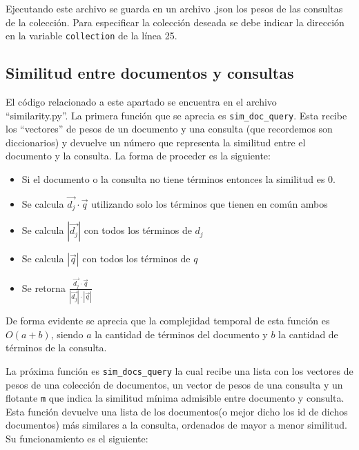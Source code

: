 \documentclass[runningheads]{llncs}
\begin{document}
	Ejecutando este archivo se guarda en un archivo .json los pesos de las consultas de la colecci\'on. Para especificar la colecci\'on deseada se debe indicar la direcci\'on en la variable \verb|collection| de la l\'inea 25.
	
	\subsection{Similitud entre documentos y consultas}
	
	El c\'odigo relacionado  a este apartado se encuentra en el archivo\\ ``similarity.py''. La primera funci\'on que se aprecia es \verb|sim_doc_query|. Esta recibe los ``vectores'' de pesos de un documento y una consulta (que recordemos son diccionarios) y devuelve un n\'umero que representa la similitud entre el documento y la consulta. La forma de proceder es la siguiente:
	
	\begin{itemize}
		\item Si el documento o la consulta no tiene t\'erminos entonces la similitud es 0.
		
		\item Se calcula $\overrightarrow{d_j}\cdot\overrightarrow{q}$ utilizando solo los t\'erminos que tienen en com\'un ambos
		
		\item Se calcula $|\overrightarrow{d_j}|$ con todos los t\'erminos de $d_j$
		
		\item Se calcula $|\overrightarrow{q}|$ con todos los t\'erminos de $q$
		
		\item Se retorna $\frac{\overrightarrow{d_j}\cdot\overrightarrow{q}}{|\overrightarrow{d_j}|\cdot|\overrightarrow{q}|}$
	\end{itemize}
	
	De forma evidente se aprecia que la complejidad temporal de esta funci\'on es $O(a + b)$, siendo $a$ la cantidad de t\'erminos del documento y $b$ la cantidad de t\'erminos de la consulta.
		
	La pr\'oxima funci\'on es \verb|sim_docs_query| la cual recibe una lista con los vectores de pesos de una colecci\'on de documentos, un vector de pesos de una consulta y un flotante \verb|m| que indica la similitud m\'inima admisible entre documento y consulta. Esta funci\'on devuelve una lista de los documentos(o mejor dicho los id de dichos documentos) m\'as similares a la consulta, ordenados de mayor a menor similitud. Su funcionamiento es el siguiente:
	
\end{document}
